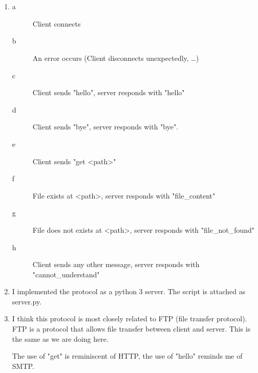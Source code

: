 \documentclass[12pt, a4paper]{article}
\begin{document}
\section{} %
\begin{enumerate}[a]
	\item %

	\begin{description}
		\item[a] Client connects
		\item[b] An error occurs (Client disconnects unexpectedly, \dots)
		\item[c] Client sends "hello", server responds with "hello"
		\item[d] Client sends "bye", server responds with "bye".
		\item[e] Client sends "get \textless path\textgreater"
		\item[f] File exists at \textless path\textgreater, server responds with "file\_content"
		\item[g] File does not exists at \textless path\textgreater, server responds with "file\_not\_found"
		\item[h] Client sends any other message, server responds with "cannot\_understand"
	\end{description}

	\item %
	I implemented the protocol as a python 3 server. The script is attached as server.py.

	\item %
	I think this protocol is most closely related to FTP (file transfer protocol). FTP is a protocol that allows file transfer between client and server. This is the same as we are doing here.

	The use of "get" is reminiscent of HTTP, the use of "hello" reminds me of SMTP.
\end{enumerate}
\end{document}
